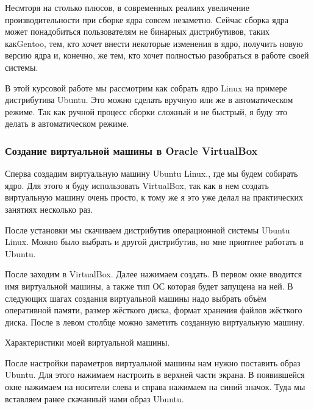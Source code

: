 Несмторя на столько плюсов, в современных реалиях увеличение производительности при сборке ядра совсем незаметно. Сейчас сборка ядра может понадобиться пользователям не бинарных дистрибутивов, таких как\newline Gentoo, тем, кто хочет внести некоторые изменения в ядро, получить новую  версию ядра и, конечно, же тем, кто хочет полностью разобраться в работе своей системы.

В этой курсовой работе мы рассмотрим как собрать ядро Linux на примере дистрибутива Ubuntu. Это можно сделать вручную или же в автоматическом режиме. Так как ручной процесс сборки сложный и не быстрый, я буду это делать в автоматическом режиме.

    \subsubsection{Создание виртуальной машины в Oracle VirtualBox}
Сперва создадим виртуальную машину Ubuntu Linux., где мы будем собирать ядро. Для этого я буду использовать VirtualBox, так как в нем создать виртуальную машину очень просто, к тому же я это уже делал на практических занятиях несколько раз. 

\newpage
После установки мы скачиваем дистрибутив операционной системы Ubuntu Linux. Можно было выбрать и другой дистрибутив, но мне приятнее работать в Ubuntu. 


После заходим в VirtualBox. Далее нажимаем создать. В первом окне вводится имя виртуальной машины, а также тип ОС которая будет запущена на ней. В следующих шагах создания виртуальной машины надо выбрать объём оперативной памяти, размер жёсткого диска, формат хранения файлов жёсткого диска. После в левом столбце можно заметить созданную виртуальную машину.

\newpage
Характеристики моей виртуальной машины.
\newpage

После настройки параметров виртуальной машины нам нужно поставить образ Ubuntu. Для этого нажимаем настроить в верхней части экрана. В появившейся окне нажимаем на носители слева и справа нажимаем на синий значок. Туда мы вставляем ранее скачанный нами образ Ubuntu.
\newpage


